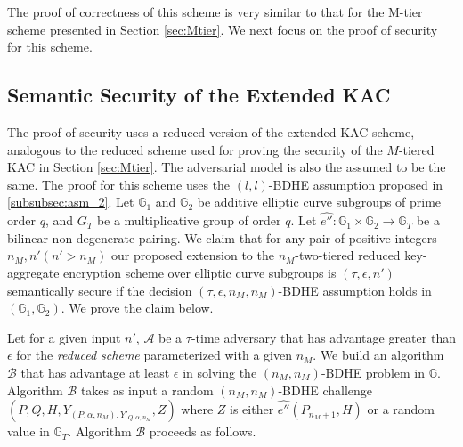 The proof of correctness of this scheme is very similar to that for the M-tier scheme presented in Section \ref{sec:Mtier}. We next focus on the proof of security for this scheme.


\subsection{Semantic Security of the Extended KAC}
\label{subsec:proof_extended}

The proof of security uses a reduced version of the extended KAC scheme, analogous to the reduced scheme used for proving the security of the $M$-tiered KAC in Section \ref{sec:Mtier}. The adversarial model is also the assumed to be the same. The proof for this scheme uses the $(l,l)$-BDHE assumption proposed in \ref{subsubsec:asm_2}. Let $\mathbb{G}_1$ and $\mathbb{G}_2$ be additive elliptic curve subgroups of prime order $q$, and $G_T$ be a multiplicative group of order $q$. Let $\hat{e''}:\mathbb{G}_1 \times \mathbb{G}_2\longrightarrow\mathbb{G}_T$ be a bilinear non-degenerate pairing. We claim that for any pair of positive integers $n_M,n' (n'>n_M)$ our proposed extension to the $n_M$-two-tiered reduced key-aggregate encryption scheme over elliptic curve subgroups is $(\tau,\epsilon,n')$ semantically secure if the decision $(\tau,\epsilon,n_M,n_M)$-BDHE assumption holds in $(\mathbb{G}_1,\mathbb{G}_2)$. We prove the claim below.

\textbf{} Let for a given input $n'$, $\mathcal{A}$ be a $\tau$-time adversary that has advantage greater than $\epsilon$ for the \emph{reduced scheme} parameterized with a given $n_M$. We build an algorithm $\mathcal{B}$ that has advantage at least $\epsilon$ in solving the $(n_M,n_M)$-BDHE problem in $\mathbb{G}$. Algorithm $\mathcal{B}$ takes as input a random $(n_M,n_M)$-BDHE challenge $(P,Q,H,Y_{(P,\alpha,n_M),Y'_{Q,\alpha,n_M}},Z)$ where $Z$ is either $\hat{e''}(P_{n_M+1},H)$ or a random value in $\mathbb{G}_T$. Algorithm $\mathcal{B}$ proceeds as follows.

